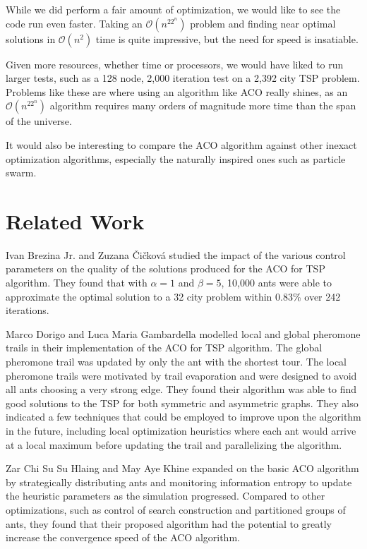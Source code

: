 \documentclass[twocolumn]{article}
\begin{document}
While we did perform a fair amount of optimization, we would like to see the
code run even faster. Taking an $\mathcal{O}(n^22^n)$ problem and finding 
near optimal solutions in $\mathcal{O}(n^2)$ time is quite impressive, but
the need for speed is insatiable.

Given more resources, whether time or processors, we would have liked to run 
larger tests, such as a 128 node, 2,000 iteration test on a 2,392 city TSP 
problem. Problems like these are where using an algorithm like ACO really
shines, as an $\mathcal{O}(n^22^n)$ algorithm requires many orders of 
magnitude more time than the span of the universe.

It would also be interesting to compare the ACO algorithm against other
inexact optimization algorithms, especially the naturally inspired ones
such as particle swarm. 

\section{Related Work}

Ivan Brezina Jr. and Zuzana \v{C}i\v{c}kov\'{a} \cite{mis:aco} studied the 
impact of the various control parameters on the quality of the solutions 
produced for the ACO for TSP algorithm. They found that with $\alpha=1$ and 
$\beta=5$, 10,000 ants were able to approximate the optimal solution to a 32 city
problem within 0.83\% over 242 iterations. 

Marco Dorigo and Luca Maria Gambardella \cite{iridia:aco} modelled local and 
global pheromone trails in their implementation of the ACO for TSP algorithm. 
The global pheromone trail was updated by only the ant with the shortest tour. 
The local pheromone trails were motivated by trail evaporation and were designed
to avoid all ants choosing a very strong edge. They found their algorithm was 
able to find good solutions to the TSP for both symmetric and asymmetric graphs.
They also indicated a few techniques that could be employed to improve upon the 
algorithm in the future, including local optimization heuristics where each ant 
would arrive at a local maximum before updating the trail and parallelizing the
algorithm. 

Zar Chi Su Su Hlaing and May Aye Khine \cite{ipcsit:aco} expanded on the basic 
ACO algorithm by strategically distributing ants and monitoring information 
entropy to update the heuristic parameters as the simulation progressed. 
Compared to other optimizations, such as control of search construction and 
partitioned groups of ants, they found that their proposed algorithm had the 
potential to greatly increase the convergence speed of the ACO algorithm. 
\end{document}

